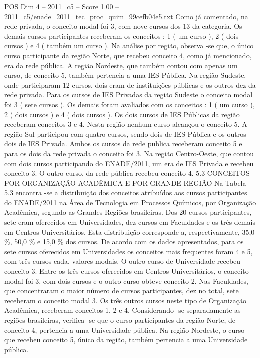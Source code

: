\begin{textsample}{POS Dim 4 – 2011\_c5 – Score 1.00 – 2011\_c5/enade\_2011\_tec\_proc\_quim\_99cefb04e5.txt}
Como já comentado, na rede privada, o conceito modal foi 3, com nove cursos dos 13 da categoria.
Os demais cursos participantes receberam os conceitos : 1 ( um curso ), 2 ( dois cursos ) e 4 ( também um curso ).
Na análise por região, observa -se que, o único curso participante da região Norte, que recebeu conceito 4, como já mencionado, era da rede pública.
A região Nordeste, que também contou com apenas um curso, de conceito 5, também pertencia a uma IES Pública.
Na região Sudeste, onde participaram 12 cursos, dois eram de instituições públicas e os outros dez da rede privada.
Para os cursos de IES Privadas da região Sudeste o conceito modal foi 3 ( sete cursos ).
Os demais foram avaliados com os conceitos : 1 ( um curso ), 2 ( dois cursos ) e 4 ( dois cursos ).
Os dois cursos de IES Públicas da região receberam conceitos 3 e 4.
Nesta região nenhum curso alcançou o conceito 5.
A região Sul participou com quatro cursos, sendo dois de IES Pública e os outros dois de IES Privada.
Ambos os cursos da rede publica receberam conceito 5 e para os dois da rede privada o conceito foi 3.
Na região Centro-Oeste, que contou com dois cursos participando do ENADE/2011, um era de IES Privada e recebeu conceito 3.
O outro curso, da rede pública recebeu conceito 4. 5.3 CONCEITOS POR ORGANIZAÇÃO ACADÊMICA E POR GRANDE REGIÃO Na Tabela 5.3 encontra -se a distribuição dos conceitos atribuídos aos cursos participantes do ENADE/2011 na Área de Tecnologia em Processos Químicos, por Organização Acadêmica, segundo as Grandes Regiões brasileiras.
Dos 20 cursos participantes, sete eram oferecidos em Universidades, dez cursos em Faculdades e os três demais em Centros Universitários.
Esta distribuição corresponde a, respectivamente, 35,0 \%, 50,0 \% e 15,0 \% dos cursos.
De acordo com os dados apresentados, para os sete cursos oferecidos em Universidades os conceitos mais frequentes foram 4 e 5, com três cursos cada, valores modais.
O outro curso de Universidade recebeu conceito 3.
Entre os três cursos oferecidos em Centros Universitários, o conceito modal foi 3, com dois cursos e o outro curso obteve conceito 2.
Nas Faculdades, que concentraram o maior número de cursos participantes, dez no total, sete receberam o conceito modal 3.
Os três outros cursos neste tipo de Organização Acadêmica, receberam conceitos 1, 2 e 4.
Considerando -se separadamente as regiões brasileiras, verifica -se que o curso participantes da região Norte, de conceito 4, pertencia a uma Universidade pública.
Na região Nordeste, o curso que recebeu conceito 5, único da região, também pertencia a uma Universidade pública.

\end{textsample}
